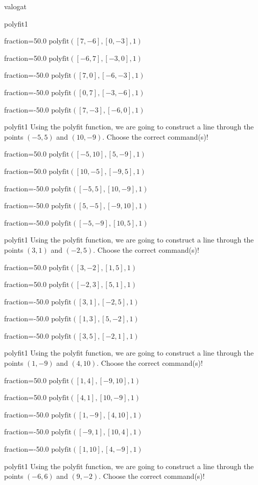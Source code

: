 \documentclass[12pt]{article}
\begin{document}
\begin{quiz}{valogat}
\begin{multi}[multiple]{polyfit1}
\item[fraction=50.0] $\mathrm{polyfit}([7,-6], [0,-3], 1)$
\item[fraction=50.0] $\mathrm{polyfit}([-6,7], [-3,0], 1)$
\item[fraction=-50.0]  $\mathrm{polyfit}([7,0], [-6,-3], 1)$
\item[fraction=-50.0]  $\mathrm{polyfit}([0,7], [-3,-6], 1)$
\item[fraction=-50.0]  $\mathrm{polyfit}([7,-3], [-6,0], 1)$
\end{multi}
\begin{multi}[multiple]{polyfit1}
Using the polyfit function, we are going to construct a line through the points $\left(-5,5\right)$ and $\left(10,-9\right)$.
Choose the correct command(s)!

\item[fraction=50.0] $\mathrm{polyfit}([-5,10], [5,-9], 1)$
\item[fraction=50.0] $\mathrm{polyfit}([10,-5], [-9,5], 1)$
\item[fraction=-50.0]  $\mathrm{polyfit}([-5,5], [10,-9], 1)$
\item[fraction=-50.0]  $\mathrm{polyfit}([5,-5], [-9,10], 1)$
\item[fraction=-50.0]  $\mathrm{polyfit}([-5,-9], [10,5], 1)$
\end{multi}
\begin{multi}[multiple]{polyfit1}
Using the polyfit function, we are going to construct a line through the points $\left(3,1\right)$ and $\left(-2,5\right)$.
Choose the correct command(s)!

\item[fraction=50.0] $\mathrm{polyfit}([3,-2], [1,5], 1)$
\item[fraction=50.0] $\mathrm{polyfit}([-2,3], [5,1], 1)$
\item[fraction=-50.0]  $\mathrm{polyfit}([3,1], [-2,5], 1)$
\item[fraction=-50.0]  $\mathrm{polyfit}([1,3], [5,-2], 1)$
\item[fraction=-50.0]  $\mathrm{polyfit}([3,5], [-2,1], 1)$
\end{multi}
\begin{multi}[multiple]{polyfit1}
Using the polyfit function, we are going to construct a line through the points $\left(1,-9\right)$ and $\left(4,10\right)$.
Choose the correct command(s)!

\item[fraction=50.0] $\mathrm{polyfit}([1,4], [-9,10], 1)$
\item[fraction=50.0] $\mathrm{polyfit}([4,1], [10,-9], 1)$
\item[fraction=-50.0]  $\mathrm{polyfit}([1,-9], [4,10], 1)$
\item[fraction=-50.0]  $\mathrm{polyfit}([-9,1], [10,4], 1)$
\item[fraction=-50.0]  $\mathrm{polyfit}([1,10], [4,-9], 1)$
\end{multi}
\begin{multi}[multiple]{polyfit1}
Using the polyfit function, we are going to construct a line through the points $\left(-6,6\right)$ and $\left(9,-2\right)$.
Choose the correct command(s)!


\end{multi}
\end{quiz}
\end{document}
